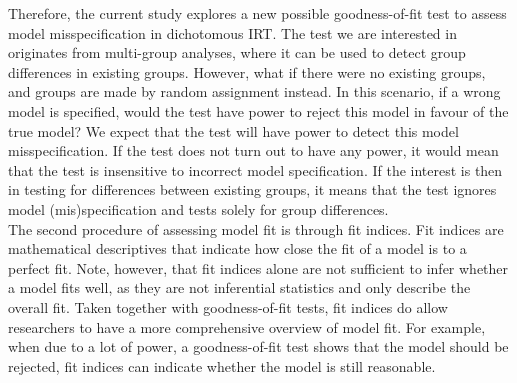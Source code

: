 \documentclass[Royal,sageapa,times,doublespace]{sagej}
\begin{document}
\indent Therefore, the current study explores a new possible goodness-of-fit test to assess model misspecification in dichotomous IRT. The test we are interested in originates from multi-group analyses, where it can be used to detect group differences in existing groups. However, what if there were no existing groups, and groups are made by random assignment instead. In this scenario, if a wrong model is specified, would the test have power to reject this model in favour of the true model? We expect that the test will have power to detect this model misspecification. If the test does not turn out to have any power, it would mean that the test is insensitive to incorrect model specification. If the interest is then in testing for differences between existing groups, it means that the test ignores model (mis)specification and tests solely for group differences. \\
\indent The second procedure of assessing model fit is through fit indices. Fit indices are mathematical descriptives that indicate how close the fit of a model is to a perfect fit. Note, however, that fit indices alone are not sufficient to infer whether a model fits well, as they are not inferential statistics and only describe the overall fit. Taken together with goodness-of-fit tests, fit indices do allow researchers to have a more comprehensive overview of model fit. For example, when due to a lot of power, a goodness-of-fit test shows that the model should be rejected, fit indices can indicate whether the model is still reasonable. \\ 
\end{document}
